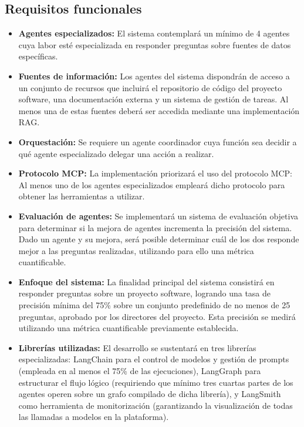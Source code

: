 \subsection{Requisitos funcionales}
\begin{itemize}
\item\textbf{Agentes especializados: }El sistema contemplará un mínimo de 4 agentes cuya labor esté especializada en responder preguntas sobre fuentes de datos específicas.
\item\textbf{Fuentes de información: }Los agentes del sistema dispondrán de acceso a un conjunto de recursos que incluirá el repositorio de código del proyecto software, una documentación externa y un sistema de gestión de tareas. Al menos una de estas fuentes deberá ser accedida mediante una implementación RAG.
\item\textbf{Orquestación: }Se requiere un agente coordinador cuya función sea decidir a qué agente especializado delegar una acción a realizar.
\item\textbf{Protocolo MCP: }La implementación priorizará el uso del protocolo MCP: Al menos uno de los agentes especializados empleará dicho protocolo para obtener las herramientas a utilizar.
\item\textbf{Evaluación de agentes: }Se implementará un sistema de evaluación objetiva para determinar si la mejora de agentes incrementa la precisión del sistema. Dado un agente y su mejora, será posible determinar cuál de los dos responde mejor a las preguntas realizadas, utilizando para ello una métrica cuantificable.
\item\textbf{Enfoque del sistema: }La finalidad principal del sistema consistirá en responder preguntas sobre un proyecto software, logrando una tasa de precisión mínima del 75\% sobre un conjunto predefinido de no menos de 25 preguntas, aprobado por los directores del proyecto. Esta precisión se medirá utilizando una métrica cuantificable previamente establecida.
\item\textbf{Librerías utilizadas: }El desarrollo se sustentará en tres librerías especializadas: LangChain para el control de modelos y gestión de prompts (empleada en al menos el 75\% de las ejecuciones), LangGraph para estructurar el flujo lógico (requiriendo que mínimo tres cuartas partes de los agentes operen sobre un grafo compilado de dicha librería), y LangSmith como herramienta de monitorización (garantizando la visualización de todas las llamadas a modelos en la plataforma).
\end{itemize}
